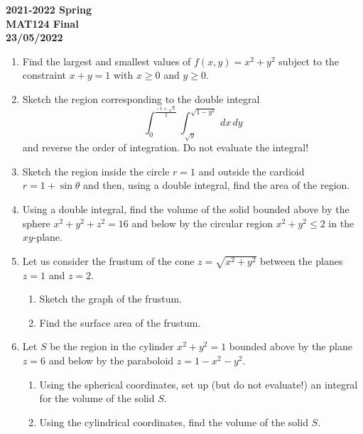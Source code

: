\documentclass[a4paper, 12pt]{article}
\begin{document}
\pagestyle{empty}

\begin{center}
\textbf{2021-2022 Spring \\MAT124 Final\\23/05/2022}
\end{center}

\begin{enumerate}[leftmargin=*,label=\textbf{\arabic*.}]
\item Find the largest and smallest values of $f(x,y) = x^2+y^2$ subject to the constraint $x+y=1$ with $x\geq0$ and $y\geq0$.

\item Sketch the region corresponding to the double integral
\[\int_0^{\frac{-1+\sqrt5}{2}}\int_{\sqrt{y}}^{\sqrt{1-y^2}}\,dx\,dy\]
and reverse the order of integration. Do not evaluate the integral!

\item Sketch the region inside the circle $r=1$ and outside the cardioid $r=1+\sin\theta$ and then, using a double integral, find the area of the region.

\item Using a double integral, find the volume of the solid bounded above by the sphere $x^2+y^2+z^2 = 16$ and below by the circular region $x^2+y^2\leq2$ in the $xy$-plane.

\item Let us consider the frustum of the cone $z=\sqrt{x^2+y^2}$ between the planes $z=1$ and $z=2$.

\begin{enumerate}[leftmargin=*,label=\textbf{\alph*.}]
\item Sketch the graph of the frustum.
\item Find the surface area of the frustum.
\end{enumerate}

\item Let $S$ be the region in the cylinder $x^2+y^2 = 1$ bounded above by the plane $z=6$ and below by the paraboloid $z=1-x^2-y^2$.

\begin{enumerate}[leftmargin=*,label=\textbf{\alph*.}]
\item Using the spherical coordinates, set up (but do not evaluate!) an integral for the volume of the solid $S$.
\item Using the cylindrical coordinates, find the volume of the solid $S$.
\end{enumerate}
\end{enumerate}
\end{document}
